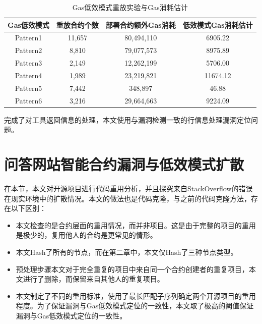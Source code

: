 \begin{table}[htbp]
\centering
\begin{tabular}{@{}cccc@{}}
\toprule
\multicolumn{1}{l}{Gas低效模式} & 重放合约个数 & 部署合约额外Gas消耗 & \multicolumn{1}{c}{低效模式Gas消耗估计} \\ \midrule
Pattern1                    & 11,657 & 80,494,110  & 6905.22                         \\
Pattern2                    & 8,810  & 79,077,573  & 8975.89                         \\
Pattern3                    & 2,149  & 12,262,199  & 5706.00                         \\
Pattern4                    & 1,989  & 23,219,821  & 11674.12                        \\
Pattern5                    & 7,442  & 348,897     & 46.88                           \\
Pattern6                    & 3,216  & 29,664,663  & 9224.09                         \\ \bottomrule
\end{tabular}
\caption{Gas低效模式重放实验与Gas消耗估计}
\label{gasg}
\end{table}

完成了对工具返回信息的处理，本文使用与漏洞检测一致的行信息处理漏洞定位问题。

\section{\label{proAnalysis}问答网站智能合约漏洞与低效模式扩散}

在本节，本文对开源项目进行代码重用分析，并且探究来自StackOverflow的错误在现实环境中的扩散情况。本文的做法也是代码克隆，与之前的代码克隆方法，存在以下区别：

\begin{itemize}
    \item 本文检查的是合约层面的重用情况，而并非项目。这是由于完整的项目的重用是极少的，复用他人的合约是更常见的情形。
    \item 本文Hash了所有的节点，而在第二章中，本文仅Hash了三种节点类型。
    \item 预处理步骤本文对于完全重复的项目中来自同一个合约创建者的重复项目，本文进行了删除，而保留来自其他人的重复项目。
    \item 本文制定了不同的重用标准，使用了最长匹配子序列\cite{longestSeries}确定两个开源项目的重用程度。为了保证漏洞与Gas低效模式定位的一致性，本文取了极高的阈值保证漏洞与Gas低效模式定位的一致性。
\end{itemize}

